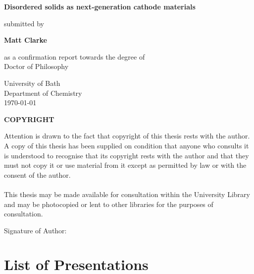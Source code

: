 \documentclass[12pt, oneside, draft]{report}
\begin{document}
	
\setcounter{tocdepth}{1} 

\begin{titlepage}
\begin{center}
\vspace*{1cm}
 
\LARGE
\textbf{Disordered solids as next-generation cathode materials}
       
\vspace{0.5cm}
\normalsize       
submitted by
       
      
\Large
\textbf{Matt Clarke}
 
\vspace{0.5cm}
\normalsize
as a confirmation report towards the degree of\\
Doctor of Philosophy
 
\vspace{0.5cm}
       
\LARGE
University of Bath\\
\normalsize
Department of Chemistry\\
       
\vspace{0.8cm}
\today
       
\vfill
\large
\textbf{COPYRIGHT}
\end{center}
Attention is drawn to the fact that copyright of this thesis rests with the author. A
copy of this thesis has been supplied on condition that anyone who consults it is
understood to recognise that its copyright rests with the author and that they must
not copy it or use material from it except as permitted by law or with the consent of
the author.
\\
\\
This thesis may be made available for consultation within the University Library and may be photocopied or lent to other libraries for the purposes of consultation.

\vspace{2cm}
\noindent Signature of Author: \dotfill
   
\end{titlepage}


\tableofcontents
\newpage
\chapter*{List of Presentations}
\newpage

\listoffigures

\newpage
{}









\pagestyle{empty}
\end{document}
